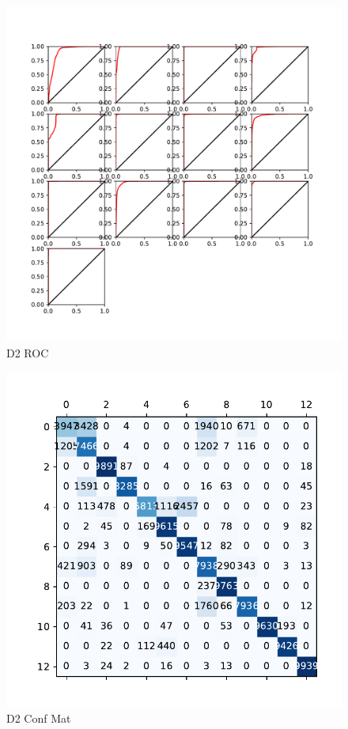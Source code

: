 \documentclass{article}
\begin{document}
	\begin{figure}[htbp]
		\centering
		\includegraphics[width=\linewidth]{Figs/diagnosis2_ROC.pdf}
		\caption{D2 ROC}
		\vspace{0.3cm}
		\label{fig:D2_ROC}
	\end{figure}
	
	\begin{figure}[htbp]
		\centering
		\includegraphics[width=\linewidth]{Figs/diagnosis2_confusion_matrix.pdf}
		\caption{D2 Conf Mat}
		\vspace{0.3cm}
		\label{fig:D2_conf_mat}
	\end{figure}
	
\end{document}
